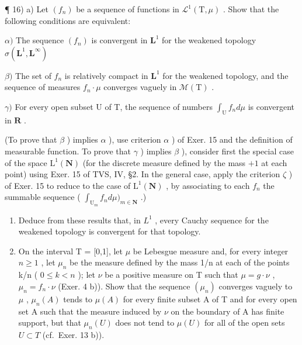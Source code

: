 ¶ 16) a) Let \((f_n)\) be a sequence of functions in \(\mathcal{L}^1(\mathrm{T},\mu)\) . Show that the following conditions are equivalent:

\(\alpha)\) The sequence \((f_n)\) is convergent in \(\mathbf{L}^1\) for the weakened topology \(\sigma(\mathbf{L}^1, \mathbf{L}^\infty)\)

\(\beta)\) The set of \(f_{n}\) is relatively compact in \(\mathbf{L}^{1}\) for the weakened topology, and the sequence of measures \(f_{n} \cdot \mu\) converges vaguely in \(\mathcal{M}(\mathrm{T})\) .

\(\gamma)\) For every open subset U of T, the sequence of numbers \(\int_{\mathrm{U}} f_n d\mu\) is convergent in \(\mathbf{R}\) .

(To prove that \(\beta\) ) implies \(\alpha\) ), use criterion \(\alpha\) ) of Exer. 15 and the definition of measurable function. To prove that \(\gamma\) ) implies \(\beta\) ), consider first the special case of the space \(\mathrm{L}^1(\mathbf{N})\) (for the discrete measure defined by the mass \(+1\) at each point) using Exer. 15 of TVS, IV, §2. In the general case, apply the criterion \(\zeta\) ) of Exer. 15 to reduce to the case of \(\mathrm{L}^1(\mathbf{N})\) , by associating to each \(f_n\) the summable sequence ( \(\int_{\mathrm{U}_m} f_n d\mu)_{m \in \mathbf{N}}\) .)

\begin{enumerate}
\def\labelenumi{\alph{enumi})}
\setcounter{enumi}{1}
\item
  Deduce from these results that, in \(L^{1}\) , every Cauchy sequence for the weakened topology is convergent for that topology.
\item
  On the interval T = {[}0,1{]}, let \(\mu\) be Lebesgue measure and, for every integer \(n \geqslant 1\) , let \(\mu_{n}\) be the measure defined by the mass 1/n at each of the points k/n ( \(0 \leqslant k < n\) ); let \(\nu\) be a positive measure on T such that \(\mu = g \cdot \nu\) , \(\mu_{n} = f_{n} \cdot \nu\) (Exer. 4 b)). Show that the sequence \((\mu_{n})\) converges vaguely to \(\mu\) , \(\mu_{n}(A)\) tends to \(\mu(A)\) for every finite subset A of T and for every open set A such that the measure induced by \(\nu\) on the boundary of A has finite support, but that \(\mu_{n}(U)\) does not tend to \(\mu(U)\) for all of the open sets \(U \subset T\) (cf.~Exer. 13 b)).
\end{enumerate}

